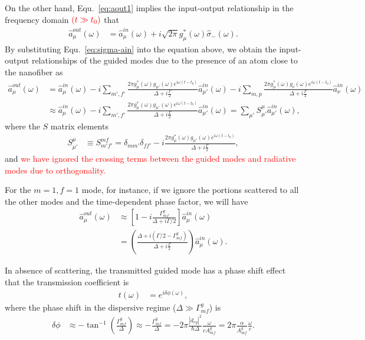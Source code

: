 \documentclass[preprint,aps,pra,onecolumn]{revtex4-1} %
\begin{document}
On the other hand, Equ.~\eqref{eq:aout1} implies the input-output relationship in the frequency domain $\mathbin{\color{red}{(t\gg t_0)}}$ that
\begin{align}
\hat{a}^{out}_\mu(\omega ) &= \hat{a}^{in}_\mu(\omega) +i \sqrt{2\pi}g_\mu^*(\omega)\hat{\sigma}_-(\omega). 
\end{align}
By substituting Equ.~\eqref{eq:sigma-ain} into the equation above, we obtain the input-output relationships of the guided modes due to the presence of an atom close to the nanofiber as
\begin{align}
\hat{a}^{out}_\mu(\omega) &= \hat{a}^{in}_\mu (\omega) \!-\! i\sum_{m',f'}\!\frac{2\pi 
g_\mu^*(\omega)g_{\mu'}(\omega)e^{i\omega(t-t_0)}}{\Delta+i\frac{\Gamma}{2}}\hat{a}^{in}_{\mu'}(\omega)
 \!-\! i\sum_{m,p}\!\frac{2\pi 
g_\mu^*(\omega)g_{\nu}(\omega)e^{i\omega(t-t_0)}}{\Delta+i\frac{\Gamma}{2}}\hat{a}^{in}_{\nu}(\omega)\\
&\approx \hat{a}^{in}_\mu (\omega) \!-\! i\sum_{m',f'}\!\frac{2\pi 
g_\mu^*(\omega)g_{\mu'}(\omega)e^{i\omega(t-t_0)}}{\Delta+i\frac{\Gamma}{2}}\hat{a}^{in}_{\mu'}(\omega)=\sum_{\mu'}S^\mu_{\mu'}\hat{a}^{in}_{\mu'}(\omega),
\end{align}
where the $S$ matrix elements
\begin{align}\label{eq:Smfmft}
S^\mu_{\mu'} &\equiv S^{mf}_{m'f'}=\delta_{mm'}\delta_{ff'}-i\frac{2\pi 
g_\mu^*(\omega)g_{\mu'}(\omega)e^{i\omega(t-t_0)}}{\Delta+i\frac{\Gamma}{2}},
\end{align}
and \textcolor{red}{we have ignored the crossing terms between the guided modes and radiative modes due to orthogonality.} 

For the $m=1,f=1$ mode, for instance, if we ignore the portions scattered to all the other modes and the time-dependent phase factor, we will have 
\begin{align}
\hat{a}_{\mu}^{out}(\omega) &\approx \left[ 1- i\frac{\Gamma^g_{mf}}{\Delta+i\Gamma/2}\right] 
\hat{a}^{in}_\mu(\omega) \\
&= \left(\frac{\Delta+i(\Gamma/2-\Gamma^g_{mf})}{\Delta+i\frac{\Gamma}{2}} 
\right)\hat{a}^{in}_\mu(\omega).
\end{align}


In absence of scattering, the transmitted guided mode has a phase shift effect that 
the transmission coefficient is
\begin{align}
t(\omega) &= e^{i\delta \phi(\omega)},
\end{align}
where the phase shift in the dispersive regime ($\Delta\gg \Gamma^g_{mf}$) is 
\begin{align}
\delta\phi &\approx -\tan^{-1}\left(\frac{\Gamma^g_{mf}}{\Delta} \right)\approx -\frac{\Gamma^g_{mf}}{\Delta}=-2\pi \frac{|d_{eg}|^2}{\hbar\Delta}\frac{\omega}{cA^g_{mf}}=2\pi \frac{\alpha}{A^g_{mf}}\frac{\omega}{c}.
\end{align}
\end{document}
